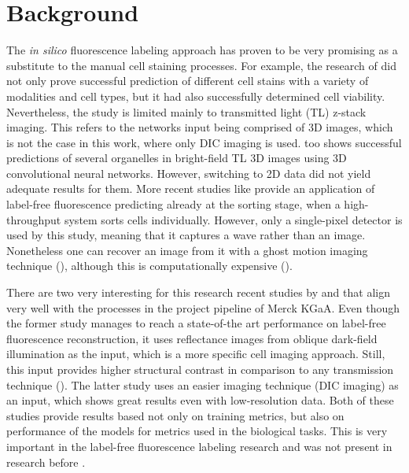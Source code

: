 \section{Background}

The \textit{in silico} fluorescence labeling approach has proven to be very promising as a substitute to the manual cell staining processes. For example, the research of \cite{Christiansen_2018} did not only prove successful prediction of different cell stains with a variety of modalities and cell types, but it had also successfully determined cell viability. Nevertheless, the study is limited mainly to transmitted light (TL) z-stack imaging. This refers to the networks input being comprised of 3D images, which is not the case in this work, where only DIC imaging is used. \cite{Ounkomol_2018} too shows successful predictions of several organelles in bright-field TL 3D images using 3D convolutional neural networks. However, switching to 2D data did not yield adequate results for them. More recent studies like \cite{Ugawa_2021} provide an application of label-free fluorescence predicting already at the sorting stage, when a high-throughput system sorts cells individually. However, only a single-pixel detector is used by this study, meaning that it captures a wave rather than an image. Nonetheless one can recover an image from it with a ghost motion imaging technique (\cite{Bromberg_2009}), although this is computationally expensive (\cite{Sadao_2018}).
    
There are two very interesting for this research recent studies by \cite{Cheng_2021} and \cite{Lachance_2020} that align very well with the processes in the project pipeline of Merck KGaA. Even though the former study manages to reach a state-of-the art performance on label-free fluorescence reconstruction, it uses reflectance images from oblique dark-field illumination as the input, which is a more specific cell imaging approach. Still, this input provides higher structural contrast in comparison to any transmission technique (\cite{Boustany_2010}). The latter study uses an easier imaging technique (DIC imaging) as an input, which shows great results even with low-resolution data. Both of these studies provide results based not only on training metrics, but also on performance of the models for metrics used in the biological tasks. This is very important in the label-free fluorescence labeling research and was not present in research before \cite{Lachance_2020}.
    
